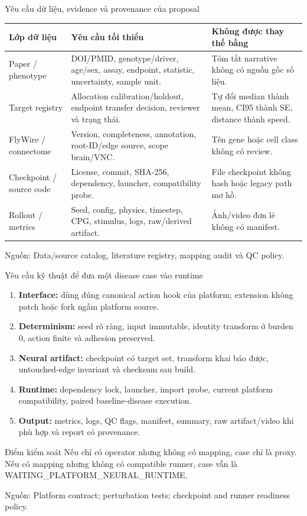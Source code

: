 \documentclass[10pt,aspectratio=169]{beamer}
\newcommand{\kw}[1]{\textcolor{uitblue}{\textbf{#1}}}
\newcommand{\source}[1]{\par\vfill{\fontsize{6.0}{7}\selectfont\color{gray}Nguồn: #1\par}}
\begin{document}
\begin{frame}{Yêu cầu dữ liệu, evidence và provenance của proposal}
\renewcommand{\arraystretch}{1.18}\scriptsize
\begin{tabular}{@{}L{3.0cm}L{5.8cm}L{5.0cm}@{}}
\toprule
\textbf{Lớp dữ liệu} & \textbf{Yêu cầu tối thiểu} & \textbf{Không được thay thế bằng}\\\midrule
Paper / phenotype & DOI/PMID, genotype/driver, age/sex, assay, endpoint, statistic, uncertainty, sample unit. & Tóm tắt narrative không có nguồn gốc số liệu.\\
Target registry & Allocation calibration/holdout, endpoint transfer decision, reviewer và trạng thái. & Tự đổi median thành mean, CI95 thành SE, distance thành speed.\\
FlyWire / connectome & Version, completeness, annotation, root-ID/edge source, scope brain/VNC. & Tên gene hoặc cell class không có review.\\
Checkpoint / source code & License, commit, SHA-256, dependency, launcher, compatibility probe. & File checkpoint không hash hoặc legacy path mơ hồ.\\
Rollout / metrics & Seed, config, physics, timestep, CPG, stimulus, logs, raw/derived artifact. & Ảnh/video đơn lẻ không có manifest.\\\bottomrule
\end{tabular}
\source{Data/source catalog, literature registry, mapping audit và QC policy.}
\end{frame}

\begin{frame}{Yêu cầu kỹ thuật để đưa một disease case vào runtime}
\begin{enumerate}\setlength\itemsep{7pt}
\item \kw{Interface:} dùng đúng canonical action hook của platform; extension không patch hoặc fork ngầm platform source.
\item \kw{Determinism:} seed rõ ràng, input immutable, identity transform ở burden 0, action finite và adhesion preserved.
\item \kw{Neural artifact:} checkpoint có target set, transform khai báo được, untouched-edge invariant và checksum sau build.
\item \kw{Runtime:} dependency lock, launcher, import probe, current platform compatibility, paired baseline-disease execution.
\item \kw{Output:} metrics, logs, QC flags, manifest, summary, raw artifact/video khi phù hợp và report có provenance.
\end{enumerate}
\begin{block}{Điểm kiểm soát}
Nếu chỉ có operator nhưng không có mapping, case chỉ là proxy. Nếu có mapping nhưng không có compatible runner, case vẫn là WAITING\_PLATFORM\_NEURAL\_RUNTIME.
\end{block}
\source{Platform contract; perturbation tests; checkpoint and runner readiness policy.}
\end{frame}
\end{document}
